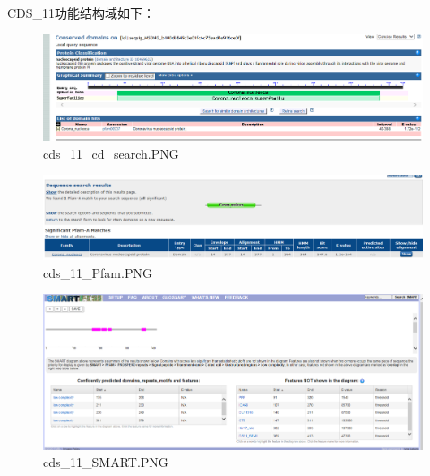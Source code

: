 \documentclass[supercite]{HustGraduPaper}
\begin{document}
	\paragraph{}\label{subpara:subpara}CDS\_11功能结构域如下：
	\begin{figure}[H]
		\centering
		\includegraphics[width=1\textwidth]{./material/practice2/cds_11/cd_search.png}
		\caption{cds\_11\_cd\_search.PNG}
	\end{figure}
	\begin{figure}[H]
		\centering
		\includegraphics[width=1\textwidth]{./material/practice2/cds_11/Pfam.png}
		\caption{cds\_11\_Pfam.PNG}
	\end{figure}
	\begin{figure}[H]
		\centering
		\includegraphics[width=1\textwidth]{./material/practice2/cds_11/SMART.png}
		\caption{cds\_11\_SMART.PNG}
	\end{figure}
\end{document}
